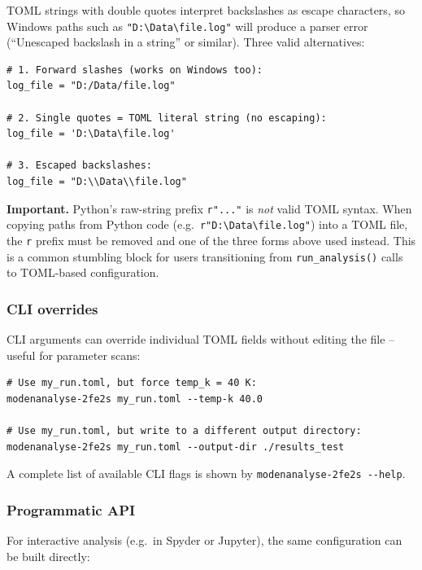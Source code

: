 \documentclass[11pt,a4paper,twoside]{article}
\theoremstyle{remark}
\begin{document}
TOML strings with double quotes interpret backslashes as escape
characters, so Windows paths such as \texttt{"D:\textbackslash{}Data\textbackslash{}file.log"}
will produce a parser error (``Unescaped backslash in a string''
or similar). Three valid alternatives:

\begin{lstlisting}[style=bash]
# 1. Forward slashes (works on Windows too):
log_file = "D:/Data/file.log"

# 2. Single quotes = TOML literal string (no escaping):
log_file = 'D:\Data\file.log'

# 3. Escaped backslashes:
log_file = "D:\\Data\\file.log"
\end{lstlisting}

\begin{warnbox}
\textbf{Important.} Python's raw-string prefix \texttt{r"..."} is
\emph{not} valid TOML syntax. When copying paths from Python code
(e.g.\ \texttt{r"D:\textbackslash{}Data\textbackslash{}file.log"})
into a TOML file, the \texttt{r} prefix must be removed and one of
the three forms above used instead. This is a common stumbling
block for users transitioning from \texttt{run\_analysis()} calls
to TOML-based configuration.
\end{warnbox}

\subsubsection*{CLI overrides}

CLI arguments can override individual TOML fields without editing
the file -- useful for parameter scans:

\begin{lstlisting}[style=bash]
# Use my_run.toml, but force temp_k = 40 K:
modenanalyse-2fe2s my_run.toml --temp-k 40.0

# Use my_run.toml, but write to a different output directory:
modenanalyse-2fe2s my_run.toml --output-dir ./results_test
\end{lstlisting}

A complete list of available CLI flags is shown by
\texttt{modenanalyse-2fe2s -{}-help}.

\subsubsection*{Programmatic API}

For interactive analysis (e.g.\ in Spyder or Jupyter), the same
configuration can be built directly:
\end{document}
